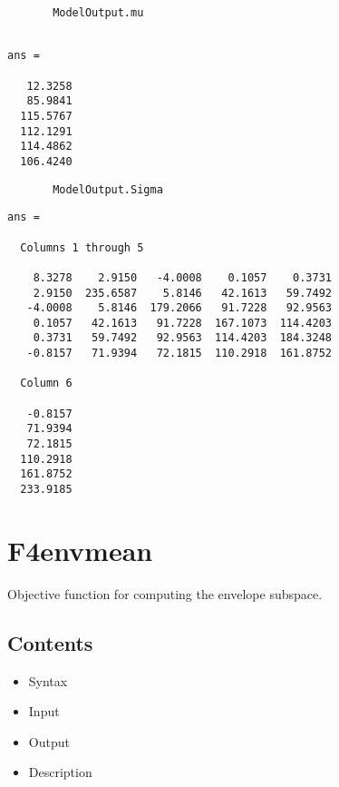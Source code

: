 \documentclass[a4paper,11pt,openany]{memoir}
\begin{document}
\begin{verbatim}       ModelOutput.mu\end{verbatim}
        \color{lightgray} \ttfamily\begin{verbatim}

ans =

   12.3258
   85.9841
  115.5767
  112.1291
  114.4862
  106.4240

\end{verbatim} \rmfamily
\color{black}

\begin{verbatim}       ModelOutput.Sigma\end{verbatim}



        \color{lightgray} \ttfamily\begin{verbatim}
ans =

  Columns 1 through 5

    8.3278    2.9150   -4.0008    0.1057    0.3731
    2.9150  235.6587    5.8146   42.1613   59.7492
   -4.0008    5.8146  179.2066   91.7228   92.9563
    0.1057   42.1613   91.7228  167.1073  114.4203
    0.3731   59.7492   92.9563  114.4203  184.3248
   -0.8157   71.9394   72.1815  110.2918  161.8752

  Column 6

   -0.8157
   71.9394
   72.1815
  110.2918
  161.8752
  233.9185

\end{verbatim} \rmfamily
\color{black}
    

\newpage

\rmfamily
\color{black}\section{F4envmean}

\begin{par}
Objective function for computing the envelope subspace.
\end{par} \vspace{1em}

\subsection*{Contents}

\begin{itemize}
\setlength{\itemsep}{-1ex}
   \item Syntax
   \item Input
   \item Output
   \item Description
\end{itemize}
\end{document}
